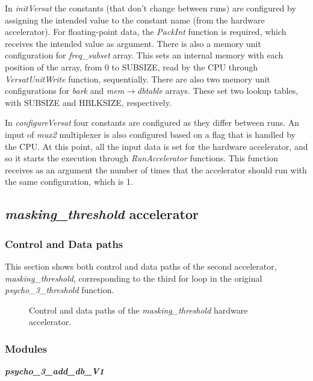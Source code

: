 In \textit{initVersat} the constants (that don't change between runs) are configured by assigning the intended value to the constant name (from the hardware accelerator). For floating-point data, the \textit{PackInt} function is required, which receives the intended value as argument.
There is also a memory unit configuration for \textit{freq\_subset} array. This sets an internal memory with each position of the array, from 0 to SUBSIZE, read by the CPU through \textit{VersatUnitWrite} function, sequentially.
There are also two memory unit configurations for \textit{bark} and \textit{mem}$\rightarrow$\textit{dbtable} arrays. These set two lookup tables, with SUBSIZE and HBLKSIZE, respectively.

In \textit{configureVersat} four constants are configured as they differ between runs. An input of \textit{mux2} multiplexer is also configured based on a flag that is handled by the CPU.
At this point, all the input data is set for the hardware accelerator, and so it starts the execution through \textit{RunAccelerator} functions. This function receives as an argument the number of times that the accelerator should run with the same configuration, which is 1.


\subsection{\textit{masking\_threshold} accelerator}

\subsubsection{Control and Data paths}
This section shows both control and data paths of the second accelerator, \textit{masking\_threshold}, corresponding to the third for loop in the original \textit{psycho\_3\_threshold} function.

\begin{figure}[H]
\centerline{}
\caption{Control and data paths of the \textit{masking\_threshold} hardware accelerator.}
\label{data2}
\end{figure}

\subsubsection{Modules}

\vspace{0.5cm}

\textbf{\textit{psycho\_3\_add\_db\_V1}}

